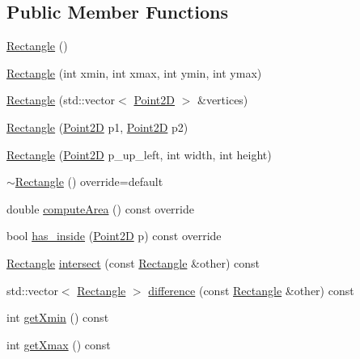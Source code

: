 \subsection*{Public Member Functions}
\begin{DoxyCompactItemize}
\item 
\hyperlink{classGeometry_1_1Rectangle_a3a73665b3e36e9d73968ca77eece4552}{Rectangle} ()
\item 
\hyperlink{classGeometry_1_1Rectangle_a1cd6a95c02b14cf1e2dd8bd0c2d2070a}{Rectangle} (int xmin, int xmax, int ymin, int ymax)
\item 
\hyperlink{classGeometry_1_1Rectangle_af43cb3bd05884b9edd3cadfacbf379f7}{Rectangle} (std\+::vector$<$ \hyperlink{classGeometry_1_1Point2D}{Point2\+D} $>$ \&vertices)
\item 
\hyperlink{classGeometry_1_1Rectangle_a03200e2f3bb2e4fca3b2f76d768e5c95}{Rectangle} (\hyperlink{classGeometry_1_1Point2D}{Point2\+D} p1, \hyperlink{classGeometry_1_1Point2D}{Point2\+D} p2)
\item 
\hyperlink{classGeometry_1_1Rectangle_aba6f31692e8a75c818b6adb90b8619f5}{Rectangle} (\hyperlink{classGeometry_1_1Point2D}{Point2\+D} p\+\_\+up\+\_\+left, int width, int height)
\item 
\hyperlink{classGeometry_1_1Rectangle_a29f446cb310ac71f9826ee9c8226191b}{$\sim$\+Rectangle} () override=default
\item 
double \hyperlink{classGeometry_1_1Rectangle_adcae3b63e18582f1d4983dfa80029fb7}{compute\+Area} () const override
\item 
bool \hyperlink{classGeometry_1_1Rectangle_ab186008b8f7c4b99fec564021c40e3eb}{has\+\_\+inside} (\hyperlink{classGeometry_1_1Point2D}{Point2\+D} p) const override
\item 
\hyperlink{classGeometry_1_1Rectangle}{Rectangle} \hyperlink{classGeometry_1_1Rectangle_afd899e69807bf618719805dff42f574d}{intersect} (const \hyperlink{classGeometry_1_1Rectangle}{Rectangle} \&other) const 
\item 
std\+::vector$<$ \hyperlink{classGeometry_1_1Rectangle}{Rectangle} $>$ \hyperlink{classGeometry_1_1Rectangle_ac803730dcde1c4e059abd1dc962b6314}{difference} (const \hyperlink{classGeometry_1_1Rectangle}{Rectangle} \&other) const 
\item 
int \hyperlink{classGeometry_1_1Rectangle_a44036e573fe4cfb1533048a607a1dfe0}{get\+Xmin} () const 
\item 
int \hyperlink{classGeometry_1_1Rectangle_abb5e007b1aa9b4ec5639610a4b885204}{get\+Xmax} () const 
\item 

\end{DoxyCompactItemize}
